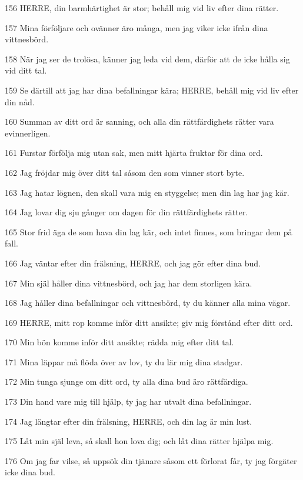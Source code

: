 \par 156 HERRE, din barmhärtighet är stor; behåll mig vid liv efter dina rätter.
\par 157 Mina förföljare och ovänner äro många, men jag viker icke ifrån dina vittnesbörd.
\par 158 När jag ser de trolösa, känner jag leda vid dem, därför att de icke hålla sig vid ditt tal.
\par 159 Se därtill att jag har dina befallningar kära; HERRE, behåll mig vid liv efter din nåd.
\par 160 Summan av ditt ord är sanning, och alla din rättfärdighets rätter vara evinnerligen.
\par 161 Furstar förfölja mig utan sak, men mitt hjärta fruktar för dina ord.
\par 162 Jag fröjdar mig över ditt tal såsom den som vinner stort byte.
\par 163 Jag hatar lögnen, den skall vara mig en styggelse; men din lag har jag kär.
\par 164 Jag lovar dig sju gånger om dagen för din rättfärdighets rätter.
\par 165 Stor frid äga de som hava din lag kär, och intet finnes, som bringar dem på fall.
\par 166 Jag väntar efter din frälsning, HERRE, och jag gör efter dina bud.
\par 167 Min själ håller dina vittnesbörd, och jag har dem storligen kära.
\par 168 Jag håller dina befallningar och vittnesbörd, ty du känner alla mina vägar.
\par 169 HERRE, mitt rop komme inför ditt ansikte; giv mig förstånd efter ditt ord.
\par 170 Min bön komme inför ditt ansikte; rädda mig efter ditt tal.
\par 171 Mina läppar må flöda över av lov, ty du lär mig dina stadgar.
\par 172 Min tunga sjunge om ditt ord, ty alla dina bud äro rättfärdiga.
\par 173 Din hand vare mig till hjälp, ty jag har utvalt dina befallningar.
\par 174 Jag längtar efter din frälsning, HERRE, och din lag är min lust.
\par 175 Låt min själ leva, så skall hon lova dig; och låt dina rätter hjälpa mig.
\par 176 Om jag far vilse, så uppsök din tjänare såsom ett förlorat får, ty jag förgäter icke dina bud.

